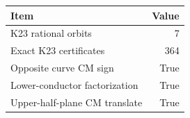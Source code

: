 \begin{tabular}{lr}\toprule Item & Value \\
\midrule
K23 rational orbits & 7 \\
Exact K23 certificates & 364 \\
Opposite curve CM sign & True \\
Lower-conductor factorization & True \\
Upper-half-plane CM translate & True \\
\bottomrule\end{tabular}
